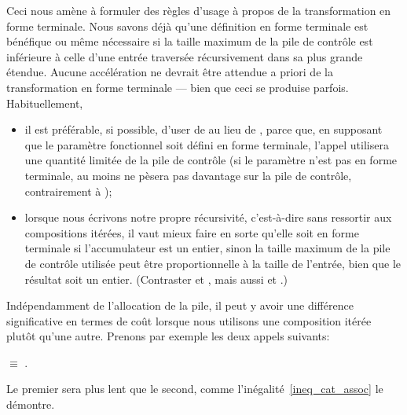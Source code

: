 Ceci nous amène à formuler des règles d'usage à propos de la
transformation en forme terminale. Nous savons déjà qu'une définition
en forme terminale est bénéfique ou même nécessaire si la taille
maximum de la pile de contrôle est inférieure à celle d'une entrée
traversée récursivement dans sa plus grande étendue. Aucune
accélération ne devrait être attendue a priori de la transformation en
forme terminale --- bien que ceci se produise parfois. Habituellement,
\begin{itemize}

  \item il est préférable, si possible, d'user de  au
  lieu de , parce que, en supposant que le paramètre
  fonctionnel soit défini en forme terminale, l'appel utilisera une
  quantité limitée de la pile de contrôle (si le paramètre n'est pas
  en forme terminale, au moins  ne pèsera pas
  davantage sur la pile de contrôle, contrairement à
  );

  \item lorsque nous écrivons notre propre récursivité, c'est-à-dire
  sans ressortir aux compositions itérées, il vaut mieux faire en
  sorte qu'elle soit en forme terminale si l'accumulateur est un
  entier, sinon la taille maximum de la pile de contrôle utilisée peut
  être proportionnelle à la taille de l'entrée, bien que le résultat
  soit un entier. (Contraster  et ,
  mais aussi  et .)

\end{itemize}
Indépendamment de l'allocation de la pile, il peut y avoir une
différence significative en termes de coût lorsque nous utilisons une
composition itérée plutôt qu'une autre. Prenons par exemple les deux
appels suivants:
\begin{center}
\(\equiv\)
.
\end{center}
Le premier sera plus lent que le second, comme
l'inégalité~\eqref{ineq_cat_assoc}  le
démontre.

